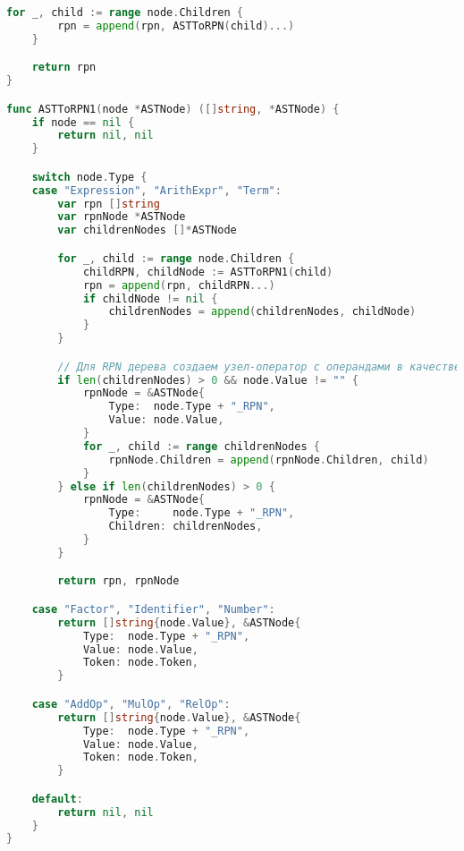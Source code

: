 \begin{lstlisting}[language=Go, caption={Код модуля \textit{parser}}]
	for _, child := range node.Children {
		rpn = append(rpn, ASTToRPN(child)...)
	}

	return rpn
}

func ASTToRPN1(node *ASTNode) ([]string, *ASTNode) {
	if node == nil {
		return nil, nil
	}

	switch node.Type {
	case "Expression", "ArithExpr", "Term":
		var rpn []string
		var rpnNode *ASTNode
		var childrenNodes []*ASTNode

		for _, child := range node.Children {
			childRPN, childNode := ASTToRPN1(child)
			rpn = append(rpn, childRPN...)
			if childNode != nil {
				childrenNodes = append(childrenNodes, childNode)
			}
		}

		// Для RPN дерева создаем узел-оператор с операндами в качестве детей
		if len(childrenNodes) > 0 && node.Value != "" {
			rpnNode = &ASTNode{
				Type:  node.Type + "_RPN",
				Value: node.Value,
			}
			for _, child := range childrenNodes {
				rpnNode.Children = append(rpnNode.Children, child)
			}
		} else if len(childrenNodes) > 0 {
			rpnNode = &ASTNode{
				Type:     node.Type + "_RPN",
				Children: childrenNodes,
			}
		}

		return rpn, rpnNode

	case "Factor", "Identifier", "Number":
		return []string{node.Value}, &ASTNode{
			Type:  node.Type + "_RPN",
			Value: node.Value,
			Token: node.Token,
		}

	case "AddOp", "MulOp", "RelOp":
		return []string{node.Value}, &ASTNode{
			Type:  node.Type + "_RPN",
			Value: node.Value,
			Token: node.Token,
		}

	default:
		return nil, nil
	}
}
\end{lstlisting}

